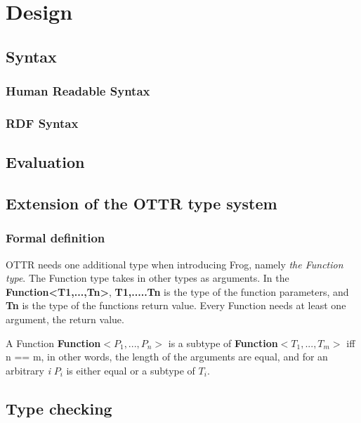 
\chapter{Design} %

\section{Syntax}
\subsection{Human Readable Syntax}

\subsection{RDF Syntax}

\section{Evaluation}

\section{Extension of the OTTR type system}
\subsection{Formal definition}
OTTR needs one additional type when introducing Frog, namely \emph{the Function type}. The Function type takes in other types as arguments. In the \textbf{Function<T1,...,Tn>},\textbf{ T1,.....Tn} is the type of the function parameters, and \textbf{Tn} is the type of the functions return value. Every Function needs at least one argument, the return value. 

\para
A Function \textbf{Function$<P_1,...,P_n>$} is a subtype of \textbf{Function$<T_1,...,T_m>$} iff n == m, in other words, the length of the arguments are equal, and for an arbitrary \textit{i} \textbf{$P_i$} is either equal or a subtype of \textbf{$T_i$}.

\section{Type checking}



